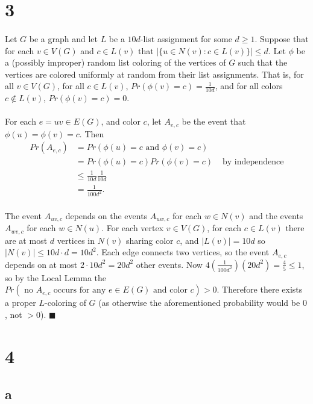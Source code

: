 \documentclass[letterpaper,12pt,oneside,onecolumn]{report}
\begin{document}
\section*{3}
\paragraph{}
Let $G$ be a graph and let $L$ be a $10d$-list assignment for some $d \geq 1$. Suppose that for each $v \in V(G)$ and $c \in L(v)$ that $|\{ u \in N(v) : c \in L(v) \}| \leq d$. Let $\phi$ be a (possibly improper) random list coloring of the vertices of $G$ such that the vertices are colored uniformly at random from their list assignments. That is, for all $v \in V(G)$, for all $c \in L(v)$, $Pr(\phi(v) = c) = \frac{1}{10d}$, and for all colors $c \not\in L(v)$, $Pr(\phi(v) = c) = 0$.
\paragraph{}
For each $e = uv \in E(G)$, and color $c$, let $A_{e,c}$ be the event that $\phi(u) = \phi(v) = c$. Then 
\begin{align*}
Pr(A_{e,c}) &= Pr(\phi(u) = c \text{ and } \phi(v) = c) \\
&= Pr(\phi(u) = c)Pr(\phi(v) = c) &\text{ by independence} \\
&\leq \frac{1}{10d}\frac{1}{10d} \\
&= \frac{1}{100d^2}.
\end{align*}
\paragraph{}
The event $A_{uv,c}$ depends on the events $A_{uw, c}$ for each $w \in N(v)$ and the events $A_{wv,c}$ for each $w \in N(u)$. For each vertex $v \in V(G)$, for each $c \in L(v)$ there are at most $d$ vertices in $N(v)$ sharing color $c$, and $|L(v)| = 10d$ so $|N(v)| \leq 10d\cdot d = 10d^2$. Each edge connects two vertices, so the event $A_{e,c}$ depends on at most $2\cdot 10d^2 = 20d^2$ other events. Now $4(\frac{1}{100d^2})(20d^2) = \frac{4}{5} \leq 1$, so by the Local Lemma the $Pr(\text{ no } A_{e,c} \text{ occurs for any }e\in E(G)\text{ and color }c) > 0$. Therefore there exists a proper $L$-coloring of $G$ (as otherwise the aforementioned probability would be $0$, not $>0$). $\blacksquare$
\section*{4}
\subsection*{a}
\end{document}

